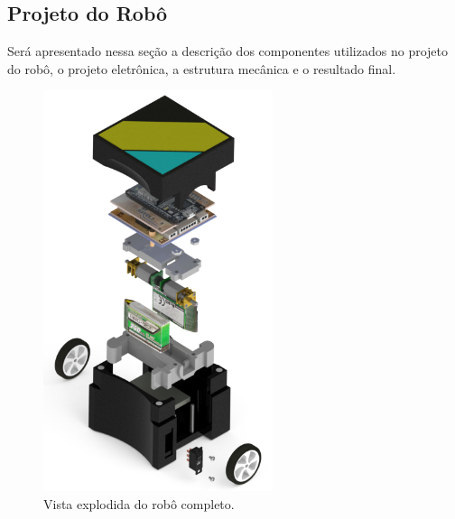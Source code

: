 \subsection{Projeto do Robô}
Será apresentado nessa seção a descrição dos componentes utilizados no projeto do robô, o projeto eletrônica, a estrutura mecânica e o resultado final.





\begin{figure}[H]
    \centering
    \includegraphics[width=0.6\textwidth]{imagens/robo_completo_explodido.png}
    \caption{Vista explodida do robô completo.}
    \label{fig:robo_completo_explodido}
\end{figure}

